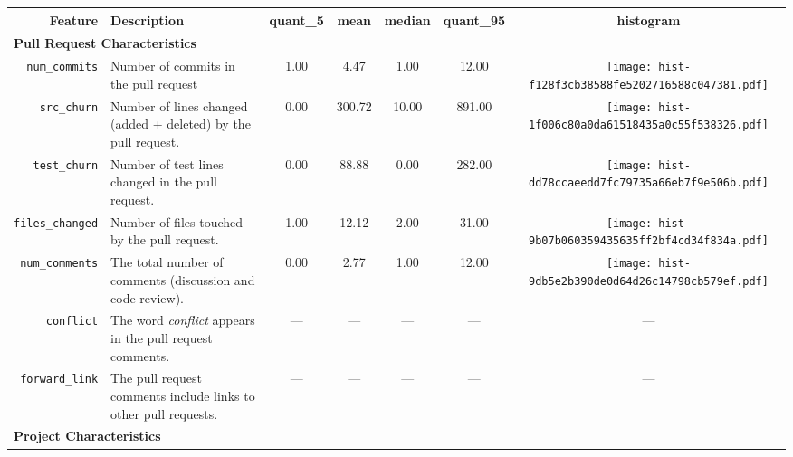 \begin{table*}[ht]
\centering
\begin{small}
\begin{tabular}{rp{20em}ccccc}
  \hline
  \bfseries{Feature} & \bfseries{Description} & quant\_5 & mean & median & quant\_95 & histogram \\ 
  \hline

  \multicolumn{2}{l}{\bf{Pull Request Characteristics}}\\

  \texttt{num\_commits} & Number of commits in the pull request & 1.00 & 4.47 & 1.00 & 12.00 & \texttt{[image: hist-f128f3cb38588fe5202716588c047381.pdf]} \\ 
  \texttt{src\_churn} & Number of lines changed (added + deleted) by the pull request. & 0.00 & 300.72 & 10.00 & 891.00 & \texttt{[image: hist-1f006c80a0da61518435a0c55f538326.pdf]} \\ 
  \texttt{test\_churn} & Number of test lines changed in the pull request. & 0.00 & 88.88 & 0.00 & 282.00 & \texttt{[image: hist-dd78ccaeedd7fc79735a66eb7f9e506b.pdf]} \\ 
  \texttt{files\_changed} & Number of files touched by the pull request. & 1.00 & 12.12 & 2.00 & 31.00 & \texttt{[image: hist-9b07b060359435635ff2bf4cd34f834a.pdf]} \\ 
  \texttt{num\_comments} & The total number of comments (discussion and code review). & 0.00 & 2.77 & 1.00 & 12.00 & \texttt{[image: hist-9db5e2b390de0d64d26c14798cb579ef.pdf]} \\ 
  
  \texttt{conflict} & The word \emph{conflict} appears in the pull request comments.
 & --- & --- & --- & --- & ---\\

    \texttt{forward\_link} & The pull request comments include links to other
    pull requests. & --- & --- & --- & --- & --- \\


  \multicolumn{2}{l}{\bf{Project Characteristics}}\\


\end{tabular}
\end{small}
\end{table*}
